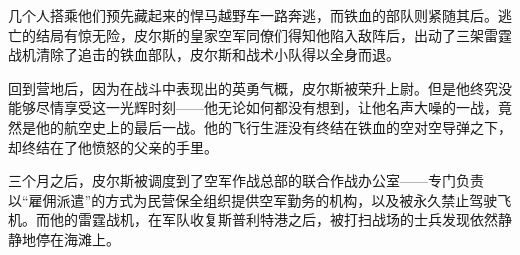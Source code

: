 几个人搭乘他们预先藏起来的悍马越野车一路奔逃，而铁血的部队则紧随其后。逃亡的结局有惊无险，皮尔斯的皇家空军同僚们得知他陷入敌阵后，出动了三架雷霆战机清除了追击的铁血部队，皮尔斯和战术小队得以全身而退。

回到营地后，因为在战斗中表现出的英勇气概，皮尔斯被荣升上尉。但是他终究没能够尽情享受这一光辉时刻——他无论如何都没有想到，让他名声大噪的一战，竟然是他的航空史上的最后一战。他的飞行生涯没有终结在铁血的空对空导弹之下，却终结在了他愤怒的父亲的手里。

三个月之后，皮尔斯被调度到了空军作战总部的联合作战办公室——专门负责以“雇佣派遣”的方式为民营保全组织提供空军勤务的机构，以及被永久禁止驾驶飞机。而他的雷霆战机，在军队收复斯普利特港之后，被打扫战场的士兵发现依然静静地停在海滩上。

